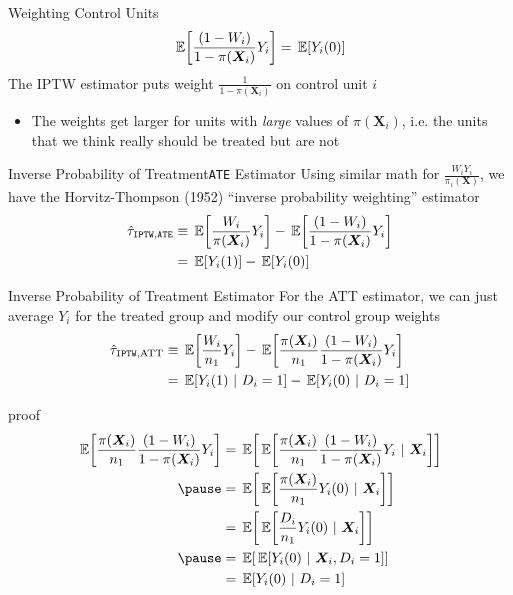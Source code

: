 \documentclass[aspectratio=169,t,11pt,table]{beamer}
\begin{document}
\begin{frame}{Weighting Control Units}
  \vspace*{-\bigskipamount}
  $$
    \expec{\frac{(1 - W_i)}{1 - \pi(\bm{X}_i)} Y_i} = \expec{Y_i(0)}
  $$
  The IPTW estimator puts weight $\frac{1}{1 - \pi(\bm{X}_i)}$ on control unit $i$
  \begin{itemize}
    \item The weights get larger for units with \emph{large} values of $\pi(\bm{X}_i)$, i.e. the units that we think really should be treated but are not
  \end{itemize}
\end{frame}

\begin{frame}{Inverse Probability of Treatment}{\texttt{ATE} Estimator}
  Using similar math for $\frac{W_i Y_i}{\pi_i(\bm{X})}$, we have the Horvitz-Thompson (1952) ``inverse probability weighting'' estimator
  \begin{align*}
    \hat{\tau}_{\texttt{IPTW},\texttt{ATE}} 
    &\equiv \expec{\frac{W_i}{\pi(\bm{X}_i)} Y_i} - \expec{\frac{(1 - W_i)}{1 - \pi(\bm{X}_i)} Y_i} \\
    &= \expec{Y_i(1)} - \expec{Y_i(0)}
  \end{align*}
\end{frame}

\begin{frame}{Inverse Probability of Treatment}{ Estimator}
  For the ATT estimator, we can just average $Y_i$ for the treated group and modify our control group weights
  \begin{align*}
    \hat{\tau}_{\texttt{IPTW},\text{ATT}}
    &\equiv \expec{\frac{W_i}{n_1} Y_i} - \expec{\frac{\pi(\bm{X}_i)}{n_1} \frac{(1 - W_i)}{1 - \pi(\bm{X}_i)} Y_i} \\
    &= \expec{Y_i(1)}{D_i = 1} - \expec{Y_i(0)}{D_i = 1}
  \end{align*}
\end{frame}

\begin{frame}{ proof}
  \begin{align*}
    \expec{\frac{\pi(\bm{X}_i)}{n_1} \frac{(1 - W_i)}{1 - \pi(\bm{X}_i)} Y_i} 
    &= \expec{ \expec{ \frac{\pi(\bm{X}_i)}{n_1} \frac{(1 - W_i)}{1 - \pi(\bm{X}_i)} Y_i }{\bm{X}_i} } \\ \pause
    &= \expec{ \expec{\frac{\pi(\bm{X}_i)}{n_1} Y_i(0)}{\bm{X}_i} } \\
    &= \expec{ \expec{\frac{D_i}{n_1} Y_i(0)}{\bm{X}_i} } \\ \pause
    &= \expec{ \expec{Y_i(0)}{\bm{X}_i, D_i = 1} } \\
    &= \expec{Y_i(0)}{D_i = 1}
  \end{align*}
\end{frame}
\end{document}
